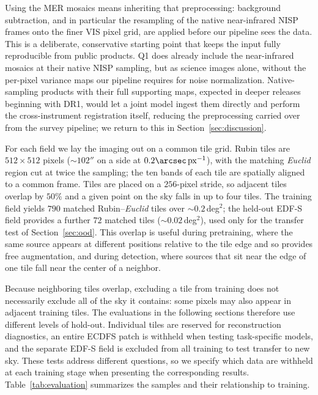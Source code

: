 \documentclass[twocolumn,linenumbers]{aastex701}
\newcommand{\arcsecpx}{\arcsec\,\mathrm{px}^{-1}}
\begin{document}
Using the MER mosaics means inheriting that preprocessing: background subtraction, and in particular the resampling of the native near-infrared NISP frames onto the finer VIS pixel grid, are applied before our pipeline sees the data. This is a deliberate, conservative starting point that keeps the input fully reproducible from public products. Q1 does already include the near-infrared mosaics at their native NISP sampling, but as science images alone, without the per-pixel variance maps our pipeline requires for noise normalization. Native-sampling products with their full supporting maps, expected in deeper releases beginning with DR1, would let a joint model ingest them directly and perform the cross-instrument registration itself, reducing the preprocessing carried over from the survey pipeline; we return to this in Section~\ref{sec:discussion}.


For each field we lay the imaging out on a common tile grid. Rubin tiles are $512\times512$ pixels ($\sim102''$ on a side at $0.2\arcsecpx$), with the matching \textit{Euclid} region cut at twice the sampling; the ten bands of each tile are spatially aligned to a common frame. Tiles are placed on a $256$-pixel stride, so adjacent tiles overlap by $50\%$ and a given point on the sky falls in up to four tiles. The training field yields $790$ matched Rubin--\textit{Euclid} tiles over $\sim0.2$\,deg$^2$; the held-out EDF-S field provides a further $72$ matched tiles ($\sim0.02$\,deg$^2$), used only for the transfer test of Section~\ref{sec:ood}. This overlap is useful during pretraining, where the same source appears at different positions relative to the tile edge and so provides free augmentation, and during detection, where sources that sit near the edge of one tile fall near the center of a neighbor.

Because neighboring tiles overlap, excluding a tile from training does not necessarily exclude all of the sky it contains: some pixels may also appear in adjacent training tiles. The evaluations in the following sections therefore use different levels of hold-out. Individual tiles are reserved for reconstruction diagnostics, an entire ECDFS patch is withheld when testing task-specific models, and the separate EDF-S field is excluded from all training to test transfer to new sky. These tests address different questions, so we specify which data are withheld at each training stage when presenting the corresponding results. Table~\ref{tab:evaluation} summarizes the samples and their relationship to training.
\end{document}
